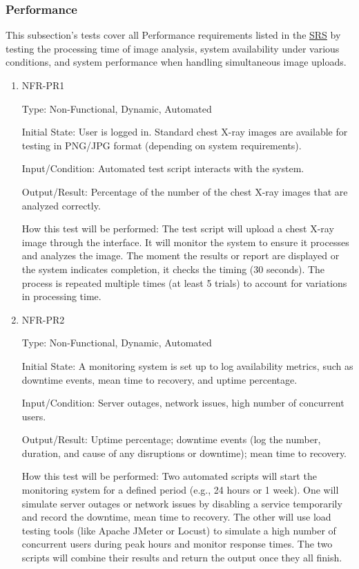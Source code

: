 \documentclass[12pt, titlepage]{article}
\begin{document}
\subsubsection{Performance}

This subsection's tests cover all Performance requirements listed in the \href{https://github.com/RezaJodeiri/CXR-Capstone/blob/main/docs/SRS/SRS.pdf}{SRS} \citep{SRS}
 by testing the processing time of image analysis, system availability under various conditions, and system performance when handling simultaneous image uploads.

\begin{enumerate}

\item{NFR-PR1\\}\label{NFR-PR1}

Type: Non-Functional, Dynamic, Automated

Initial State: User is logged in. Standard chest X-ray images are available for testing in PNG/JPG format (depending on system requirements).

Input/Condition: Automated test script interacts with the system.

Output/Result: Percentage of the number of the chest X-ray images that are analyzed correctly.

How this test will be performed: The test script will upload a chest X-ray image through the interface. It will monitor the system to ensure it processes and analyzes the image. The moment the results or report are displayed or the system indicates completion, it checks the timing (30 seconds). The process is repeated multiple times (at least 5 trials) to account for variations in processing time.

\item{NFR-PR2\\}\label{NFR-PR2}

Type: Non-Functional, Dynamic, Automated

Initial State: A monitoring system is set up to log availability metrics, such as downtime events, mean time to recovery, and uptime percentage.

Input/Condition: Server outages, network issues, high number of concurrent users.

Output/Result: Uptime percentage; downtime events (log the number, duration, and cause of any disruptions or downtime); mean time to recovery.

How this test will be performed: Two automated scripts will start the monitoring system for a defined period (e.g., 24 hours or 1 week). One will simulate server outages or network issues by disabling a service temporarily and record the downtime, mean time to recovery. The other will use load testing tools (like Apache JMeter or Locust) to simulate a high number of concurrent users during peak hours and monitor response times. The two scripts will combine their results and return the output once they all finish.


\end{enumerate}
\end{document}
